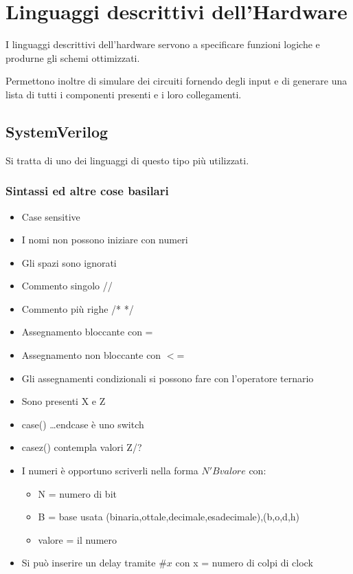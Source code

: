 \documentclass{article}
\begin{document}
\section{Linguaggi descrittivi dell’Hardware
}

I linguaggi descrittivi dell’hardware servono a specificare funzioni logiche e produrne gli schemi ottimizzati.\newline

Permettono inoltre di simulare dei circuiti fornendo degli input e di generare una lista di tutti i componenti presenti e i loro collegamenti.

\subsection{SystemVerilog}

Si tratta di uno dei linguaggi di questo tipo più utilizzati.

\subsubsection{Sintassi ed altre cose basilari}
\begin{itemize}
    \item Case sensitive
    \item I nomi non possono iniziare con numeri
    \item Gli spazi sono ignorati
    \item Commento singolo //
    \item Commento  più righe /*  */
    \item Assegnamento bloccante con =
    \item Assegnamento non bloccante con $<$=
    \item Gli assegnamenti condizionali si possono fare con l'operatore ternario
    \item Sono presenti X e Z
    \item case() \ldots endcase è uno switch
    \item casez() contempla valori Z/?
    \item I numeri è opportuno scriverli nella forma $N'Bvalore$ con:
        \begin{itemize}
            \item N = numero di bit
            \item B = base usata (binaria,ottale,decimale,esadecimale),(b,o,d,h)
            \item valore = il numero
        \end{itemize}

    \item Si può inserire un delay tramite $\#x$ con x = numero di colpi di clock
        
\end{itemize}
\end{document}
